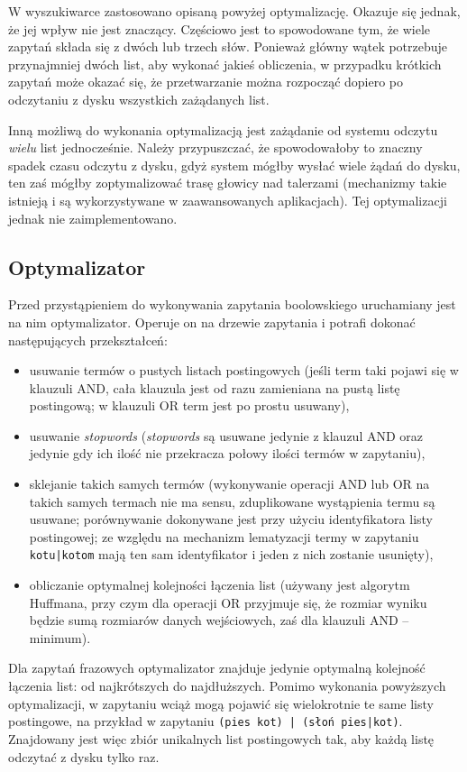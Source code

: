 \documentclass[a4paper,12pt]{article}
\begin{document}
W wyszukiwarce zastosowano opisaną powyżej optymalizację. Okazuje się jednak,
że jej wpływ nie jest znaczący. Częściowo jest to spowodowane tym, że wiele
zapytań składa się z dwóch lub trzech słów. Ponieważ główny wątek potrzebuje
przynajmniej dwóch list, aby wykonać jakieś obliczenia, w przypadku krótkich
zapytań może okazać się, że przetwarzanie można rozpocząć dopiero po odczytaniu
z dysku wszystkich zażądanych list.

Inną możliwą do wykonania optymalizacją jest zażądanie od systemu odczytu
\textit{wielu} list jednocześnie. Należy przypuszczać, że spowodowałoby
to znaczny spadek czasu odczytu z dysku, gdyż system mógłby wysłać wiele
żądań do dysku, ten zaś mógłby zoptymalizować trasę głowicy nad talerzami
(mechanizmy takie istnieją i są wykorzystywane w zaawansowanych aplikacjach).
Tej optymalizacji jednak nie zaimplementowano.

\subsection{Optymalizator}
Przed przystąpieniem do wykonywania zapytania boolowskiego uruchamiany jest
na nim optymalizator. Operuje on na drzewie zapytania i potrafi dokonać
następujących przekształceń:
\begin{itemize}
 \item usuwanie termów o pustych listach postingowych (jeśli term taki
 pojawi się w klauzuli AND, cała klauzula jest od razu zamieniana na
 pustą listę postingową; w klauzuli OR term jest po prostu usuwany),
 \item usuwanie \textit{stopwords} (\textit{stopwords} są usuwane jedynie
 z klauzul AND oraz jedynie gdy ich ilość nie przekracza połowy ilości
 termów w zapytaniu),
 \item sklejanie takich samych termów (wykonywanie operacji AND lub
 OR na takich samych termach nie ma sensu, zduplikowane wystąpienia 
 termu są usuwane; porównywanie dokonywane jest przy użyciu identyfikatora
 listy postingowej; ze względu na mechanizm lematyzacji termy w zapytaniu
 \texttt{kotu|kotom} mają ten sam identyfikator i jeden z nich zostanie
 usunięty),
 \item obliczanie optymalnej kolejności łączenia list (używany jest
 algorytm Huffmana, przy czym dla operacji OR przyjmuje się, że
 rozmiar wyniku będzie sumą rozmiarów danych wejściowych, zaś dla
 klauzuli AND -- minimum).
\end{itemize}
Dla zapytań frazowych optymalizator znajduje jedynie optymalną kolejność
łączenia list: od najkrótszych do najdłuższych.
Pomimo wykonania powyższych optymalizacji, w zapytaniu wciąż mogą pojawić
się wielokrotnie te same listy postingowe, na przykład w zapytaniu
\texttt{(pies kot) | (słoń pies|kot)}. Znajdowany jest więc zbiór
unikalnych list postingowych tak, aby każdą listę odczytać z dysku
tylko raz.
\end{document}
